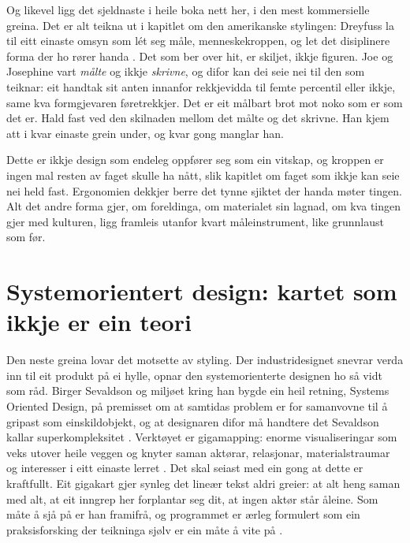 Og likevel ligg det sjeldnaste i heile boka nett her, i den mest kommersielle greina. Det er alt teikna ut i kapitlet om den amerikanske stylingen: Dreyfuss la til eitt einaste omsyn som lét seg måle, menneskekroppen, og let det disiplinere forma der ho rører handa \autocite{dreyfuss1955}. Det som ber over hit, er skiljet, ikkje figuren. Joe og Josephine vart \emph{målte} og ikkje \emph{skrivne}, og difor kan dei seie nei til den som teiknar: eit handtak sit anten innanfor rekkjevidda til femte percentil eller ikkje, same kva formgjevaren føretrekkjer. Det er eit målbart brot mot noko som er som det er. Hald fast ved den skilnaden mellom det målte og det skrivne. Han kjem att i kvar einaste grein under, og kvar gong manglar han.

Dette er ikkje design som endeleg oppfører seg som ein vitskap, og kroppen er ingen mal resten av faget skulle ha nått, slik kapitlet om faget som ikkje kan seie nei held fast. Ergonomien dekkjer berre det tynne sjiktet der handa møter tingen. Alt det andre forma gjer, om foreldinga, om materialet sin lagnad, om kva tingen gjer med kulturen, ligg framleis utanfor kvart måleinstrument, like grunnlaust som før.

\section{Systemorientert design: kartet som ikkje er ein teori}

Den neste greina lovar det motsette av styling. Der industridesignet snevrar verda inn til eit produkt på ei hylle, opnar den systemorienterte designen ho så vidt som råd. Birger Sevaldson og miljøet kring han bygde ein heil retning, Systems Oriented Design, på premisset om at samtidas problem er for samanvovne til å gripast som einskildobjekt, og at designaren difor må handtere det Sevaldson kallar superkompleksitet \autocite{sevaldson2022complexity}. Verktøyet er gigamapping: enorme visualiseringar som veks utover heile veggen og knyter saman aktørar, relasjonar, materialstraumar og interesser i eitt einaste lerret \autocite{sevaldson2011giga}. Det skal seiast med ein gong at dette er kraftfullt. Eit gigakart gjer synleg det lineær tekst aldri greier: at alt heng saman med alt, at eit inngrep her forplantar seg dit, at ingen aktør står åleine. Som måte å sjå på er han framifrå, og programmet er ærleg formulert som ein praksisforsking der teikninga sjølv er ein måte å vite på \autocite{sevaldson2010discussions, morrison2010getting}.

